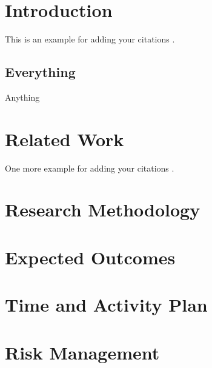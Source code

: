 \documentclass[a4paper]{article}
\begin{document}
\section{Introduction}
This is an example for adding your citations \citep{adams1995hitchhiker}.

\subsection{Everything}
Anything



\section{Related Work}
One more example for adding your citations \citep{runeson2012takes}.


\section{Research Methodology}


\section{Expected Outcomes}


\section{Time and Activity Plan}


\section{Risk Management}




\end{document}
